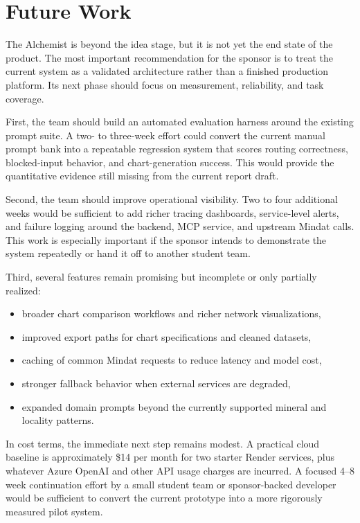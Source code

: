 \documentclass[12pt,oneside]{report}
\begin{document}
\section{Future Work}

The Alchemist is beyond the idea stage, but it is not yet the end state of the product. The most important recommendation for the sponsor is to treat the current system as a validated architecture rather than a finished production platform. Its next phase should focus on measurement, reliability, and task coverage.

First, the team should build an automated evaluation harness around the existing prompt suite. A two- to three-week effort could convert the current manual prompt bank into a repeatable regression system that scores routing correctness, blocked-input behavior, and chart-generation success. This would provide the quantitative evidence still missing from the current report draft.

Second, the team should improve operational visibility. Two to four additional weeks would be sufficient to add richer tracing dashboards, service-level alerts, and failure logging around the backend, MCP service, and upstream Mindat calls. This work is especially important if the sponsor intends to demonstrate the system repeatedly or hand it off to another student team.

Third, several features remain promising but incomplete or only partially realized:
\begin{itemize}[leftmargin=0.75in]
    \item broader chart comparison workflows and richer network visualizations,
    \item improved export paths for chart specifications and cleaned datasets,
    \item caching of common Mindat requests to reduce latency and model cost,
    \item stronger fallback behavior when external services are degraded,
    \item expanded domain prompts beyond the currently supported mineral and locality patterns.
\end{itemize}

In cost terms, the immediate next step remains modest. A practical cloud baseline is approximately \$14 per month for two starter Render services, plus whatever Azure OpenAI and other API usage charges are incurred. A focused 4--8 week continuation effort by a small student team or sponsor-backed developer would be sufficient to convert the current prototype into a more rigorously measured pilot system.
\end{document}
